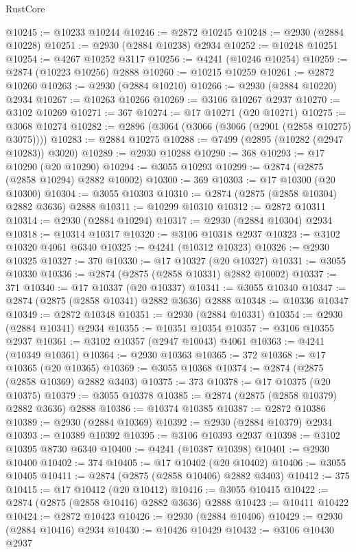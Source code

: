 \begin{lexlean}{RustCore}
\begin{coremodule}
@10245 := @10233 @10244
@10246 := @2872 @10245
@10248 := @2930 (@2884 @10228)
@10251 := @2930 (@2884 @10238) @2934
@10252 := @10248 @10251
@10254 := @4267 @10252 @3117
@10256 := @4241 (@10246 @10254)
@10259 := @2874 (@10223 @10256) @2888
@10260 := @10215 @10259
@10261 := @2872 @10260
@10263 := @2930 (@2884 @10210)
@10266 := @2930 (@2884 @10220) @2934
@10267 := @10263 @10266
@10269 := @3106 @10267 @2937
@10270 := @3102 @10269
@10271 := 367
@10274 := @17 @10271 (@20 @10271)
@10275 := @3068 @10274
@10282 := @2896 (@3064 (@3066 (@3066 (@2901 (@2858 @10275) @3075))))
@10283 := @2884 @10275
@10288 := @7499 (@2895 (@10282 (@2947 @10283)) @3020)
@10289 := @2930 @10288
@10290 := 368
@10293 := @17 @10290 (@20 @10290)
@10294 := @3055 @10293
@10299 := @2874 (@2875 (@2858 @10294) @2882 @10002)
@10300 := 369
@10303 := @17 @10300 (@20 @10300)
@10304 := @3055 @10303
@10310 := @2874 (@2875 (@2858 @10304) @2882 @3636) @2888
@10311 := @10299 @10310
@10312 := @2872 @10311
@10314 := @2930 (@2884 @10294)
@10317 := @2930 (@2884 @10304) @2934
@10318 := @10314 @10317
@10320 := @3106 @10318 @2937
@10323 := @3102 @10320 @4061 @6340
@10325 := @4241 (@10312 @10323)
@10326 := @2930 @10325
@10327 := 370
@10330 := @17 @10327 (@20 @10327)
@10331 := @3055 @10330
@10336 := @2874 (@2875 (@2858 @10331) @2882 @10002)
@10337 := 371
@10340 := @17 @10337 (@20 @10337)
@10341 := @3055 @10340
@10347 := @2874 (@2875 (@2858 @10341) @2882 @3636) @2888
@10348 := @10336 @10347
@10349 := @2872 @10348
@10351 := @2930 (@2884 @10331)
@10354 := @2930 (@2884 @10341) @2934
@10355 := @10351 @10354
@10357 := @3106 @10355 @2937
@10361 := @3102 @10357 (@2947 @10043) @4061
@10363 := @4241 (@10349 @10361)
@10364 := @2930 @10363
@10365 := 372
@10368 := @17 @10365 (@20 @10365)
@10369 := @3055 @10368
@10374 := @2874 (@2875 (@2858 @10369) @2882 @3403)
@10375 := 373
@10378 := @17 @10375 (@20 @10375)
@10379 := @3055 @10378
@10385 := @2874 (@2875 (@2858 @10379) @2882 @3636) @2888
@10386 := @10374 @10385
@10387 := @2872 @10386
@10389 := @2930 (@2884 @10369)
@10392 := @2930 (@2884 @10379) @2934
@10393 := @10389 @10392
@10395 := @3106 @10393 @2937
@10398 := @3102 @10395 @8730 @6340
@10400 := @4241 (@10387 @10398)
@10401 := @2930 @10400
@10402 := 374
@10405 := @17 @10402 (@20 @10402)
@10406 := @3055 @10405
@10411 := @2874 (@2875 (@2858 @10406) @2882 @3403)
@10412 := 375
@10415 := @17 @10412 (@20 @10412)
@10416 := @3055 @10415
@10422 := @2874 (@2875 (@2858 @10416) @2882 @3636) @2888
@10423 := @10411 @10422
@10424 := @2872 @10423
@10426 := @2930 (@2884 @10406)
@10429 := @2930 (@2884 @10416) @2934
@10430 := @10426 @10429
@10432 := @3106 @10430 @2937

\end{coremodule}
\end{lexlean}
